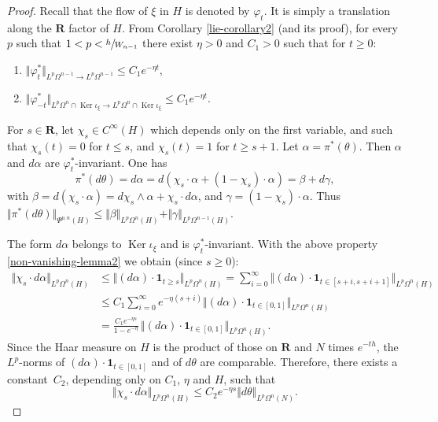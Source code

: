\documentclass[JEP,XML,SOM,Unicode,published]{cedram}
\newcommand{\RR}{\mathbf{R}}
\theoremstyle{plain}
\theoremstyle{remark}
\theoremstyle{definition}
\DeclareMathOperator{\Ker}{Ker}
\begin{document}
\begin{proof} Recall that the flow of $\xi$ in $H$ is denoted by $\varphi_t$.
It is simply a translation along the $\RR$ factor of $H$.
From Corollary \ref{lie-corollary2} (and its proof), for every $p$ such that $1<p< \sfrac{h}{W_{n-1}}$ there exist $\eta >0$ and $C_1> 0$ such that for $t \geqslant 0$:
\begin{enumerate}
\item\label{non-vanishing-lemma1} $\Vert \varphi^*_t \Vert_{L^p \Omega^{n-1} \to L^p \Omega^{n-1}} \leqslant C_1 e^{-\eta t}$,
\item\label{non-vanishing-lemma2} $\Vert \varphi^*_{-t} \Vert_{L^p \Omega^{n} \cap \Ker \iota_\xi \to L^p \Omega^{n} \cap \Ker \iota_\xi}
\leqslant C_1 e^{-\eta t}$.
\end{enumerate}

For $s \in \RR$, let $\chi_s \in C^\infty (H)$ which depends only on the first variable, and such that $\chi_s (t) = 0$ for $t\leqslant s$, and
$\chi_s (t)=1$ for $t\geqslant s+1$.
Let $\alpha = \pi^* (\theta)$. Then $\alpha$ and $d\alpha$ are $\varphi_t^*$-invariant.
One has\vspace*{-3pt}
\[\pi^* (d\theta) = d\alpha = d(\chi_s \cdot \alpha + (1-\chi_s)\cdot \alpha) = \beta + d\gamma,\]
with $\beta = d(\chi_s \cdot \alpha) = d\chi_s \wedge \alpha + \chi_s \cdot d \alpha$, and $\gamma = (1- \chi_s)\cdot \alpha$.
Thus $\Vert \pi^* (d\theta) \Vert_{\Psi^{p,n}(H)} \leqslant \Vert \beta \Vert_{L^p \Omega^n (H)} + \Vert \gamma \Vert_{L^p \Omega^{n-1} (H)}$.

The form $d\alpha$ belongs to $\Ker \iota_\xi$ and is $\varphi_t^*$-invariant. With the above property \eqref{non-vanishing-lemma2}
we obtain (since $s \geqslant 0$):\vspace*{-3pt}
\begin{align*}
\Vert \chi_s \cdot d\alpha \Vert_{L^p \Omega^n (H)}
&\leqslant \Vert (d\alpha)\cdot \mathbf{1}_{t\geqslant s} \Vert_{L^p \Omega^n (H)}= \sum_{i=0}^\infty \Vert (d\alpha)\cdot \mathbf{1}_{t\in [s+i, s+i+1]} \Vert_{L^p \Omega^n (H)}\\[-5pt]
&\leqslant C_1 \sum_{i=0}^\infty e^{-\eta (s+i)}\Vert (d\alpha)\cdot \mathbf{1}_{t\in [0,1]} \Vert_{L^p \Omega^n (H)}\\
&= \frac{C_1 e^{-\eta s}}{1 - e^{-\eta}}\, \Vert (d\alpha)\cdot \mathbf{1}_{t\in [0,1]} \Vert_{L^p \Omega^n (H)}.
\end{align*}
Since the Haar measure on $H$ is the product of those on $\RR$ and $N$ times $e^{-th}$, the $L^p$\nobreakdash-norms of
$(d\alpha)\cdot \mathbf{1}_{t\in [0,1]} $ and of $d\theta$ are comparable.
Therefore, there exists a constant~$C_2$, depending only on $C_1$, $\eta$ and $H$, such that
\[\Vert \chi_s \cdot d\alpha \Vert_{L^p \Omega^n (H)} \leqslant C_2 e^{-\eta s} \Vert d\theta \Vert_{L^p \Omega^n(N)}.\]


\end{proof}
\end{document}
